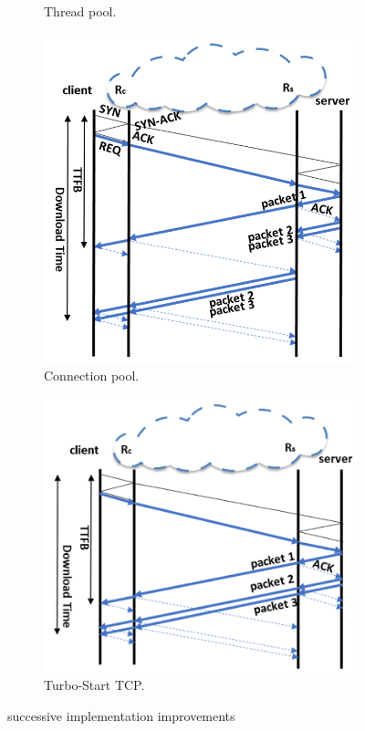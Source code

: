 \begin{figure}[!t]
\begin{subfigure}{0.75\columnwidth}
    \caption{Thread pool.} \label{fig:thread-pool}
\end{subfigure}    \centering
\begin{subfigure}{0.75\columnwidth}
  \centering
  \includegraphics[width=\columnwidth]{figures/connection.png}
    \caption{Connection pool.} \label{fig:connection-pool}
\end{subfigure}     \hfill
\begin{subfigure}{0.75\columnwidth}
  \centering
  \includegraphics[width=\columnwidth]{figures/turbo.png}
    \caption{Turbo-Start TCP.} 
    \label{fig:turbo-start-tcp}
\end{subfigure}

    \caption{\oursys successive implementation improvements}
    \label{fig:oursys-improvements}
\end{figure}


